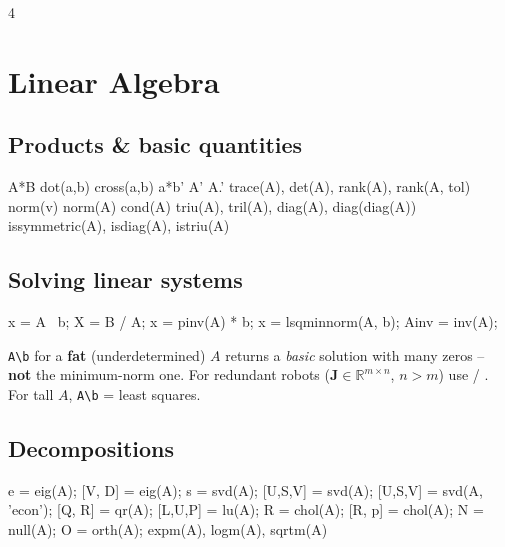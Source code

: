\documentclass[8pt,landscape]{extarticle}
\newcommand{\mc}[1]{\texttt{\detokenize{#1}}}
\begin{document}
\begin{multicols*}{4}
\section{Linear Algebra}
\subsection{Products \& basic quantities}
\begin{ml}
A*B          %
dot(a,b)     cross(a,b)           %
a*b'         %
A'  A.'      %
trace(A), det(A), rank(A), rank(A, tol)
norm(v)      %
norm(A)      %
cond(A)      %
triu(A), tril(A), diag(A), diag(diag(A))
issymmetric(A), isdiag(A), istriu(A)
\end{ml}
\subsection{Solving linear systems}
\begin{ml}
x = A \ b;        %
X = B / A;        %
x = pinv(A) * b;  %
x = lsqminnorm(A, b);   %
Ainv = inv(A);    %
\end{ml}
\begin{warn}\texttt{A\textbackslash b} for a \textbf{fat} (underdetermined) $A$ returns a \emph{basic} solution with many zeros -- \textbf{not} the minimum-norm one. For redundant robots ($\mathbf J\in\mathbb R^{m\times n}$, $n>m$) use \mc{pinv(J)} / \mc{lsqminnorm}. For tall $A$, \texttt{A\textbackslash b} = least squares.\end{warn}
\subsection{Decompositions}
\begin{ml}
e       = eig(A);           %
[V, D]  = eig(A);           %
s       = svd(A);           %
[U,S,V] = svd(A);           %
[U,S,V] = svd(A, 'econ');   %
[Q, R]  = qr(A);            %
[L,U,P] = lu(A);            %
R       = chol(A);          %
[R, p]  = chol(A);          %
N       = null(A);          %
O       = orth(A);          %
expm(A), logm(A), sqrtm(A)  %
\end{ml}

\end{multicols*}
\end{document}
